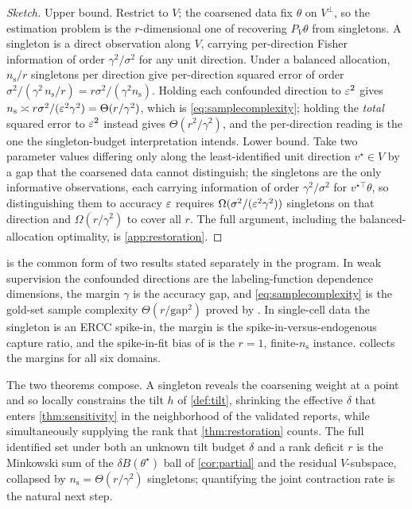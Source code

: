 \begin{proof}[Sketch]
Upper bound. Restrict to $V$; the coarsened data fix $\theta$ on $V^\perp$, so the
estimation problem is the $r$-dimensional one of recovering $P_V \theta$ from
singletons. A singleton is a direct observation along $V$, carrying per-direction
Fisher information of order $\gamma^2/\sigma^2$ for any unit direction. Under a
balanced allocation, $n_{\mathrm{s}}/r$ singletons per direction give per-direction
squared error of order $\sigma^2 /(\gamma^2\, n_{\mathrm{s}}/r) =
r\sigma^2/(\gamma^2 n_{\mathrm{s}})$. Holding each confounded direction to $\varepsilon^2$
gives $n_{\mathrm{s}} \asymp r\sigma^2/(\varepsilon^2\gamma^2) = \Theta(r/\gamma^2)$, which
is \eqref{eq:samplecomplexity}; holding the \emph{total} squared error to $\varepsilon^2$
instead gives $\Theta(r^2/\gamma^2)$, and the per-direction reading is the one the
singleton-budget interpretation intends. Lower bound. Take two parameter values
differing only along the least-identified unit direction $v^\star \in V$ by a gap
that the coarsened data cannot distinguish; the singletons are the only informative
observations, each carrying information of order $\gamma^2/\sigma^2$ for
$v^{\star\top}\theta$, so distinguishing them to accuracy $\varepsilon$ requires
$\Omega(\sigma^2/(\varepsilon^2 \gamma^2))$ singletons on that direction and
$\Omega(r/\gamma^2)$ to cover all $r$. The full argument, including the
balanced-allocation optimality, is \cref{app:restoration}.
\end{proof}

\begin{remark}
 is the common form of two results stated separately in the
program. In weak supervision the confounded directions are the labeling-function
dependence dimensions, the margin $\gamma$ is the accuracy gap, and
\eqref{eq:samplecomplexity} is the gold-set sample complexity $\Theta(r/\mathrm{gap}^2)$
proved by \citet{towell2026weaksupcoarsening}. In single-cell data the singleton is
an ERCC spike-in, the margin is the spike-in-versus-endogenous capture ratio, and
the spike-in-fit bias of \citet{towell2026scrnacoarsening} is the $r = 1$,
finite-$n_{\mathrm{s}}$ instance.  collects the margins for all
six domains.
\end{remark}

\begin{remark}
The two theorems compose. A singleton reveals the coarsening weight at a point and
so locally constrains the tilt $h$ of \cref{def:tilt}, shrinking the effective
$\delta$ that enters \cref{thm:sensitivity} in the neighborhood of the validated
reports, while simultaneously supplying the rank that \cref{thm:restoration}
counts. The full identified set under both an unknown tilt budget $\delta$ and a
rank deficit $r$ is the Minkowski sum of the $\delta B(\theta^\star)$ ball of
\cref{cor:partial} and the residual $V$-subspace, collapsed by
$n_{\mathrm{s}} = \Theta(r/\gamma^2)$ singletons; quantifying the joint contraction
rate is the natural next step.
\end{remark}
